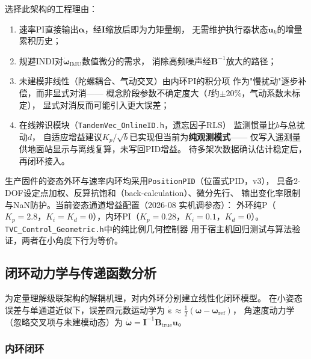 \begin{remark}
选择此架构的工程理由：
\begin{enumerate}[label=(\arabic*)]
    \item 速率PI直接输出$\boldsymbol{\alpha}$，经$\mathbf{I}$缩放后即为力矩量纲，
          无需维护执行器状态$\mathbf{u}_k$的增量累积历史；
    \item 规避INDI对$\dot{\boldsymbol{\omega}}_{\mathrm{IMU}}$数值微分的需求，
          消除高频噪声经$\mathbf{B}^{-1}$放大的路径；
    \item 未建模非线性（陀螺耦合、气动交叉）由内环PI的积分项
          作为"慢扰动"逐步补偿，而非显式对消——
          概念阶段参数不确定度大（$I$约$\pm20\%$，气动系数未标定），
          显式对消反而可能引入更大误差；
    \item 在线辨识模块（\texttt{TandemVec\_OnlineID.h}，遗忘因子RLS）
          监测惯量比$b$与总扰动$d$，
          自适应增益建议$K_p/\sqrt{b}$已实现但当前为\textbf{纯观测模式}——
          仅写入遥测量供地面站显示与离线复算，未写回PID增益。
          待多架次数据确认估计稳定后，再闭环接入。
\end{enumerate}

生产固件的姿态外环与速率内环均采用\texttt{PositionPID}（位置式PID，v3），
具备2-DOF设定点加权、反算抗饱和（back-calculation）、微分先行、
输出变化率限制与NaN防护。当前姿态通道增益配置（2026-08 实机调参态）：
外环纯P（$K_p=2.8$，$K_i=K_d=0$），内环PI（$K_p=0.28$，$K_i=0.1$，$K_d=0$）。
\texttt{TVC\_Control\_Geometric.h}中的纯比例几何控制器
用于宿主机回归测试与算法验证，两者在小角度下行为等价。
\end{remark}

\subsection{闭环动力学与传递函数分析}
\label{sec:cascade_tf}

为定量理解级联架构的解耦机理，对内外环分别建立线性化闭环模型。
在小姿态误差与单通道近似下，误差四元数运动学为
$\dot{\boldsymbol{\varepsilon}}\approx\frac{1}{2}(\boldsymbol{\omega}-\boldsymbol{\omega}_{\mathrm{ref}})$，
角速度动力学（忽略交叉项与未建模动态）为
$\dot{\boldsymbol{\omega}}=\mathbf{I}^{-1}\mathbf{B}_{\mathrm{true}}\mathbf{u}$。

\subsubsection{内环闭环}

